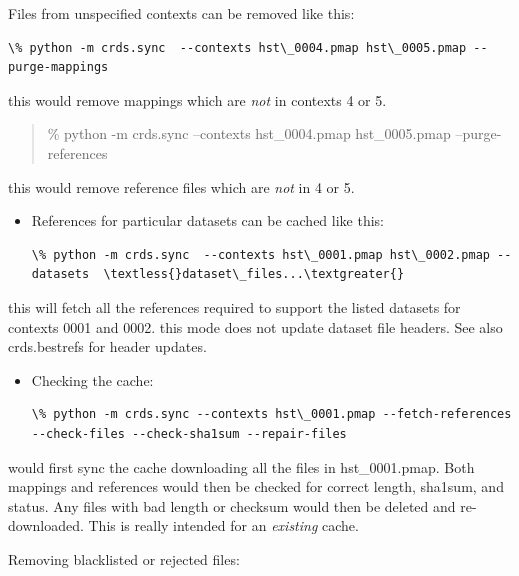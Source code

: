 \documentclass[letterpaper,10pt,english]{sphinxmanual}
\begin{document}
Files from unspecified contexts can be removed like this:

\begin{Verbatim}[commandchars=\\\{\}]
\% python -m crds.sync  --contexts hst\_0004.pmap hst\_0005.pmap --purge-mappings
\end{Verbatim}

this would remove mappings which are \emph{not} in contexts 4 or 5.
\begin{quote}

\% python -m crds.sync  --contexts hst\_0004.pmap hst\_0005.pmap --purge-references
\end{quote}

this would remove reference files which are \emph{not} in 4 or 5.
\begin{itemize}
\item {} 
References for particular datasets can be cached like this:

\begin{Verbatim}[commandchars=\\\{\}]
\% python -m crds.sync  --contexts hst\_0001.pmap hst\_0002.pmap --datasets  \textless{}dataset\_files...\textgreater{}
\end{Verbatim}

\end{itemize}

this will fetch all the references required to support the listed datasets for contexts 0001 and 0002.
this mode does not update dataset file headers.  See also crds.bestrefs for header updates.
\begin{itemize}
\item {} 
Checking the cache:

\begin{Verbatim}[commandchars=\\\{\}]
\% python -m crds.sync --contexts hst\_0001.pmap --fetch-references --check-files --check-sha1sum --repair-files
\end{Verbatim}

\end{itemize}

would first sync the cache downloading all the files in hst\_0001.pmap.  Both mappings and references would then
be checked for correct length, sha1sum, and status.   Any files with bad length or checksum
would then be deleted and re-downloaded.   This is really intended for an \emph{existing} cache.

Removing blacklisted or rejected files:
\end{document}

